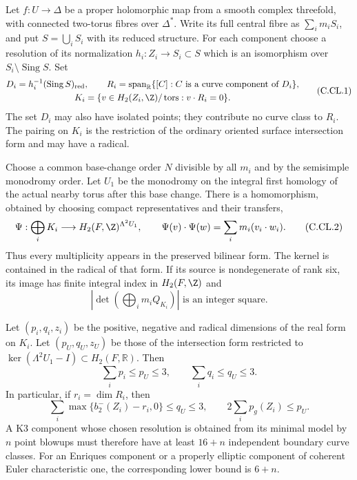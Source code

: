 
\begin{proposition}\label{cdp:st:C.2.UN.36}
Let $f:U\to\Delta$ be a proper holomorphic map from
a smooth complex threefold, with connected two-torus
fibres over $\Delta^*$. Write its full central fibre
as $\sum_i m_iS_i$, and put $S=\bigcup_iS_i$ with
its reduced structure. For each component choose a
resolution of its normalization
$h_i:Z_i\to S_i\subset S$ which is an isomorphism
over $S_i\setminus\operatorname{Sing}S$. Set
\[
 \begin{gathered}
 D_i=h_i^{-1}(\operatorname{Sing}S)_{\rm red},\qquad
 R_i=\operatorname{span}_{\mathbb R}
       \{[C]:C\text{ is a curve component of }D_i\},
 \\
 K_i=\{v\in H_2(Z_i,\Z)/\operatorname{tors}:v\cdot R_i=0\}.
 \end{gathered}
                                                               \tag{C.CL.1}\label{cdp:eq:C.CL.1}
\]
The set $D_i$ may also have isolated points; they
contribute no curve class to $R_i$. The pairing on
$K_i$ is the restriction of the ordinary oriented
surface intersection form and may have a radical.

Choose a common base-change order $N$ divisible by
all $m_i$ and by the semisimple monodromy order.
Let $U_1$ be the monodromy on the integral first
homology of the actual nearby torus after this
base change. There is a homomorphism, obtained by
choosing compact representatives and their transfers,
\[
 \Psi:\bigoplus_iK_i\longrightarrow
       H_2(F,\Z)^{\Lambda^2U_1},\qquad
 \Psi(v)\cdot\Psi(w)=\sum_i m_i(v_i\cdot w_i).
                                                               \tag{C.CL.2}\label{cdp:eq:C.CL.2}
\]
Thus every multiplicity appears in the preserved
bilinear form. The kernel is contained in the
radical of that form. If its source is nondegenerate
of rank six, its image has finite integral index
in $H_2(F,\Z)$ and
\[
 \left|\det\left(\bigoplus_i m_iQ_{K_i}\right)\right|
                       \text{ is an integer square}.
                                                               \tag{C.CL.3}\label{cdp:eq:C.CL.3}
\]

Let $(p_i,q_i,z_i)$ be the positive, negative and
radical dimensions of the real form on $K_i$.
Let $(p_U,q_U,z_U)$ be those of the intersection
form restricted to
$\ker(\Lambda^2U_1-I)\subset H_2(F,\mathbb R)$.
Then
\[
             \sum_i p_i\le p_U\le3,\qquad
             \sum_i q_i\le q_U\le3.                 \tag{C.CL.4}\label{cdp:eq:C.CL.4}
\]
In particular, if $r_i=\dim R_i$, then
\[
 \sum_i\max\{b_2^-(Z_i)-r_i,0\}\le q_U\le3,
 \qquad
                 2\sum_i p_g(Z_i)\le p_U.           \tag{C.CL.5}\label{cdp:eq:C.CL.5}
\]
A K3 component whose chosen resolution is obtained
from its minimal model by $n$ point blowups must
therefore have at least $16+n$ independent boundary
curve classes. For an Enriques component or a
properly elliptic component of coherent Euler
characteristic one, the corresponding lower bound
is $6+n$.


\end{proposition}
